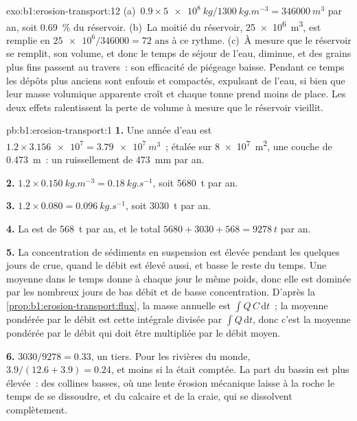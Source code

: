 \begin{solution}{exo:b1:erosion-transport:12}
(a)~$0.9 \times \qty{5e8}{kg}/\qty{1300}{kg.m^{-3}} = \qty{346000}{m^3}$ par an,
soit \qty{0.69}{\percent} du réservoir. (b)~La moitié du réservoir,
\qty{25e6}{m^3}, est remplie en $\num{25e6}/\num{346000} = \num{72}\text{ ans}$ à ce
rythme. (c)~À mesure que le réservoir se remplit, son volume, et donc le temps de séjour de
l'eau, diminue, et des grains plus fins passent au travers~: son efficacité de piégeage baisse.
Pendant ce temps les dépôts plus anciens sont enfouis et compactés, expulsant de l'eau, si bien que
leur masse volumique apparente croît et chaque tonne prend moins de place. Les deux effets ralentissent la
perte de volume à mesure que le réservoir vieillit.
\end{solution}

\begin{solution}{pb:b1:erosion-transport:1}
\textbf{1.} Une année d'eau est $1.2 \times \num{3.156e7} = \qty{3.79e7}{m^3}$~;
étalée sur \qty{8e7}{m^2}, une couche de \qty{0.473}{m}~: un ruissellement de
\qty{473}{mm} par an.

\textbf{2.} $1.2 \times \qty{0.150}{kg.m^{-3}} = \qty{0.18}{kg.s^{-1}}$, soit
\qty{5680}{t} par an.

\textbf{3.} $1.2 \times 0.080 = \qty{0.096}{kg.s^{-1}}$, soit \qty{3030}{t} par
an.

\textbf{4.} La  est de \qty{568}{t} par an, et le total $5680 + 3030 +
568 = \qty{9278}{t}$ par an.

\textbf{5.} La concentration de sédiments en suspension est élevée pendant les quelques jours
de crue, quand le débit est élevé aussi, et basse le reste du temps. Une
moyenne dans le temps donne à chaque jour le même poids, donc elle est dominée par les nombreux
jours de bas débit et de basse concentration. D'après la
\cref{prop:b1:erosion-transport:flux}, la masse annuelle est
$\int Q\,C\,\mathrm dt$~; la moyenne pondérée par le débit est cette intégrale divisée par
$\int Q\,\mathrm dt$, donc c'est la moyenne pondérée par le débit qui doit être multipliée par
le débit moyen.

\textbf{6.} $3030/9278 = \num{0.33}$, un tiers. Pour les rivières du monde,
$3.9/(12.6 + 3.9) = \num{0.24}$, et moins si la  était comptée.
La part du bassin est plus élevée~: des collines basses, où une lente érosion mécanique laisse
à la roche le temps de se dissoudre, et du calcaire et de la craie, qui se dissolvent
complètement.


\end{solution}
